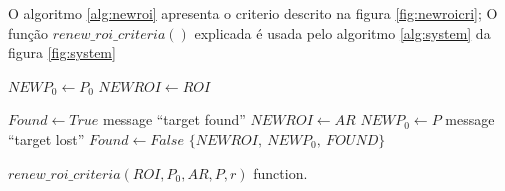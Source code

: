 O algoritmo \ref{alg:newroi} apresenta o criterio descrito na figura \ref{fig:newroicri};
O função $renew\_roi\_criteria()$ explicada é usada pelo algoritmo \ref{alg:system} da figura \ref{fig:system}


\begin{algorithm}

    $NEWP_0 \leftarrow  P_0$ \;
    $NEWROI \leftarrow  ROI$ \;
    
    {
      $Found \leftarrow True$\;
        message ``target found''\;
        {
            $NEWROI \leftarrow  AR$\;
            $NEWP_0 \leftarrow  P$\;
        }
    }
    {
      message ``target lost''\;
      $Found \leftarrow False$\;
    }
\Return  $\{NEWROI,~NEWP_0,~FOUND\}$\;
\label{alg:newroi}
\caption{$renew\_roi\_criteria(ROI,P_0,AR,P,r)$ function.}
\end{algorithm}
